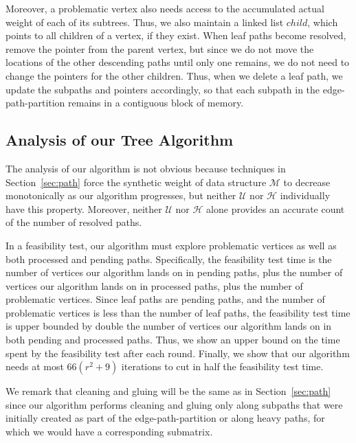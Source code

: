 Moreover, a problematic vertex also needs access to the accumulated actual weight of each of its subtrees. 
Thus, we also maintain a linked list $child$, which points to all children of a vertex, if they exist. 
When leaf paths become resolved, remove the pointer from the parent vertex, but since we do not move the locations of the other descending paths until only one remains, we do not need to change the pointers for the other children. 
Thus, when we delete a leaf path, we update the subpaths and pointers accordingly, so that each subpath in the edge-path-partition remains in a contiguous block of memory.
\subsection{Analysis of our Tree Algorithm}
\label{sec:tree:analysis}
The analysis of our algorithm is not obvious because techniques in Section~\ref{sec:path} force the synthetic weight of data structure $\mathcal{M}$ to decrease monotonically as our algorithm progresses, but neither $\mathcal{U}$ nor $\mathcal{H}$ individually have this property. 
Moreover, neither $\mathcal{U}$ nor $\mathcal{H}$ alone provides an accurate count of the number of resolved paths. 

In a feasibility test, our algorithm must explore problematic vertices as well as both processed and pending paths. 
Specifically, the feasibility test time is the number of vertices our algorithm lands on in pending paths, plus the number of vertices our algorithm lands on in processed paths, plus the number of problematic vertices. 
Since leaf paths are pending paths, and the number of problematic vertices is less than the number of leaf paths, the feasibility test time is upper bounded by double the number of vertices our algorithm lands on in both pending and processed paths.
Thus, we show an upper bound on the time spent by the feasibility test after each round. 
Finally, we show that our algorithm needs at most $66(r^2+9)$ iterations to cut in half the feasibility test time.

We remark that cleaning and gluing will be the same as in Section~\ref{sec:path} since our algorithm performs cleaning and gluing only along subpaths that were initially created as part of the edge-path-partition or along heavy paths, for which we would have a corresponding submatrix. 

